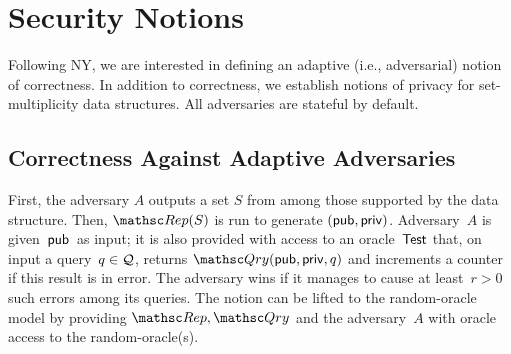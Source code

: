 \section{Security Notions}
\label{sec:security-notions}
Following NY, we are interested in defining an adaptive (i.e.,
adversarial) notion of correctness.
In addition to correctness, we establish notions of privacy for
set-multiplicity data structures.
All adversaries are stateful by default.


\subsection{Correctness Against Adaptive Adversaries}

First, the adversary $A$ outputs a set $S$ from among those supported by
the data structure. Then,
$\Rep(S)$ is run to generate $({\sf pub},{\sf priv})$.
Adversary~$A$ is given~${\sf pub}$~as input; it is also
provided with access to an oracle~$\mathsf{Test}$ that, on input a query~$q \in {\cal Q}$,
returns $\Qry(\pubaux,\privaux,q)$ and increments
a counter if this result is in error.  The adversary wins if it
manages to cause at least~$r>0$ such errors among its queries.
The notion can be lifted to the random-oracle model by providing
$\Rep,\Qry$ and the adversary~$A$ with oracle access to the
random-oracle(s).




